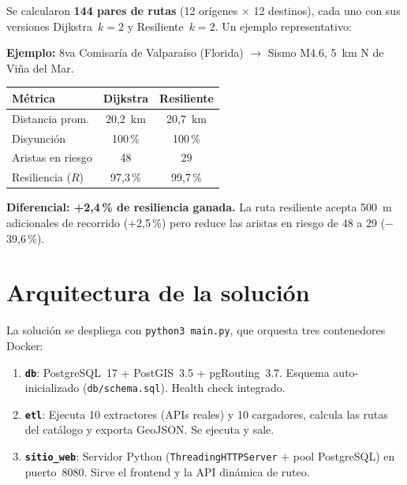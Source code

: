 \documentclass[conference]{IEEEtran}
\begin{document}
Se calcularon \textbf{144 pares de rutas} (12 orígenes $\times$ 12 destinos), cada uno con sus versiones Dijkstra~$k=2$ y Resiliente~$k=2$. Un ejemplo representativo:

\begin{notabox}
\textbf{Ejemplo:} 8va Comisaría de Valparaíso (Florida) $\to$ Sismo M4.6, 5~km N de Viña del Mar.

\smallskip
\begin{tabular}{lcc}
\toprule
\textbf{Métrica} & \textbf{Dijkstra} & \textbf{Resiliente} \\
\midrule
Distancia prom. & 20,2~km & 20,7~km \\
Disyunción & 100\,\% & 100\,\% \\
Aristas en riesgo & 48 & 29 \\
Resiliencia ($R$) & 97,3\,\% & 99,7\,\% \\
\bottomrule
\end{tabular}

\smallskip
\textbf{Diferencial: +2,4\,\% de resiliencia ganada.} La ruta resiliente acepta 500~m adicionales de recorrido (+2,5\,\%) pero reduce las aristas en riesgo de 48 a 29 ($-$39,6\,\%).
\end{notabox}


\section{Arquitectura de la solución}
\label{sec:arquitectura}

La solución se despliega con \texttt{python3 main.py}, que orquesta tres contenedores Docker:

\begin{enumerate}[label=\arabic*.,itemsep=2pt]
\item \textbf{\texttt{db}}: PostgreSQL~17 + PostGIS~3.5 + pgRouting~3.7. Esquema auto-inicializado (\texttt{db/schema.sql}). Health check integrado.
\item \textbf{\texttt{etl}}: Ejecuta 10 extractores (APIs reales) y 10 cargadores, calcula las rutas del catálogo y exporta GeoJSON. Se ejecuta y sale.
\item \textbf{\texttt{sitio\_web}}: Servidor Python (\texttt{ThreadingHTTPServer} + pool PostgreSQL) en puerto~8080. Sirve el frontend y la API dinámica de ruteo.
\end{enumerate}
\end{document}
